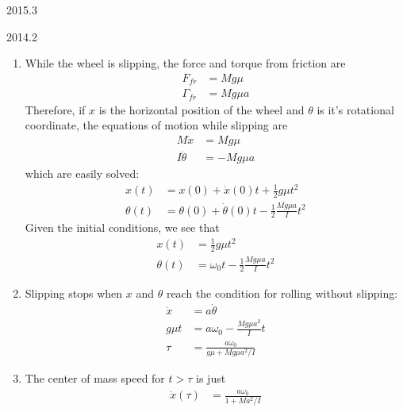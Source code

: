 \documentclass[12pt]{article}
\begin{document}
\begin{solution}{2015.3}

\end{solution}



\begin{solution}{2014.2}
  \begin{enumerate}
    \item While the wheel is slipping, the force and torque from friction are
    \begin{align*}
      F_{fr} & = Mg\mu \\
      \Gamma_{fr} & = Mg\mu a
    \end{align*}
    Therefore, if $x$ is the horizontal position of the wheel and $\theta$ is it's rotational coordinate,
    the equations of motion while slipping are
    \begin{align*}
      M \ddot{x} & = Mg\mu \\
      I \ddot{\theta} & = -Mg\mu a
    \end{align*}
    which are easily solved:
    \begin{align*}
      x(t) & = x(0) + \dot{x}(0) t + \frac{1}{2} g\mu t^2 \\
      \theta(t) & = \theta(0) + \dot{\theta}(0) t - \frac{1}{2} \frac{Mg\mu a}{I} t^2
    \end{align*}
    Given the initial conditions, we see that
    \begin{align*}
      x(t) & = \frac{1}{2} g\mu t^2 \\
      \theta(t) & = \omega_0 t - \frac{1}{2} \frac{Mg\mu a}{I} t^2
    \end{align*}

    \item Slipping stops when $x$ and $\theta$ reach the condition for rolling without slipping:
    \begin{align*}
      \dot{x} & = a \dot{\theta} \\
      g\mu t & = a \omega_0 - \frac{Mg\mu a^2}{I} t \\
      \tau & = \frac{a \omega_0}{g\mu + Mg\mu a^2/I}
    \end{align*}

    \item The center of mass speed for $t>\tau$ is just
    \begin{align*}
      \dot{x}(\tau) & = \frac{a \omega_0}{1 + Ma^2/I}
    \end{align*}

  \end{enumerate}
\end{solution}
\end{document}
